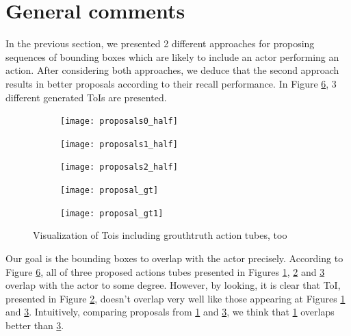 \section{General comments}

In the previous section, we presented 2 different approaches for proposing sequences of bounding boxes which are likely to include an
actor performing an action. After considering both approaches, we deduce that the second approach results in better proposals
according to their recall performance. In Figure \ref{fig:proposals}, 3 different generated ToIs are presented.

\begin{figure}[h]
  \begin{subfigure}{1\textwidth}
    \centering
    \texttt{[image: proposals0\_half]}
    \caption{}
    \label{fig:proposals0}
  \end{subfigure}

  \begin{subfigure}{1\textwidth}
    \centering
    \texttt{[image: proposals1\_half]}
    \caption{}
    \label{fig:proposals1}
  \end{subfigure}

  \begin{subfigure}{1\textwidth}
    \centering
    \texttt{[image: proposals2\_half]}
    \caption{}
    \label{fig:proposals2}
  \end{subfigure}

  \begin{subfigure}{1\textwidth}
    \centering
    \texttt{[image: proposal\_gt]}
    \caption{}
    \label{fig:proposals_gt0}
  \end{subfigure}

  \begin{subfigure}{1\textwidth}
    \centering
    \texttt{[image: proposal\_gt1]}
    \caption{}
    \label{fig:proposals_gt1}
  \end{subfigure}
  \centering
  \caption{ Visualization of Tois including grouthtruth action tubes, too }


  \label{fig:proposals}
\end{figure}

Our goal is  the bounding boxes to overlap with the actor precisely. According to Figure \ref{fig:proposals}, all of three proposed actions tubes
presented in Figures \ref{fig:proposals0}, \ref{fig:proposals1} and \ref{fig:proposals2} overlap with the actor to some degree.
However, by looking, it is clear that ToI, presented in Figure \ref{fig:proposals1}, doesn't overlap very well like those appearing at Figures \ref{fig:proposals0} and \ref{fig:proposals2}. 
Intuitively, comparing proposals from \ref{fig:proposals0} and \ref{fig:proposals2}, we think that \ref{fig:proposals0} overlaps better than \ref{fig:proposals2}.

